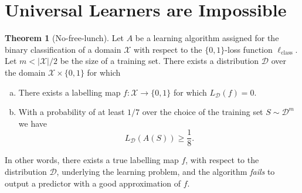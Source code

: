 \documentclass[11pt, reqno]{amsart}
\theoremstyle{definition}
\newtheorem{theorem}{Theorem}[section]
\renewcommand{\leq}{\leqslant}
\renewcommand{\geq}{\geqslant}
\DeclareMathOperator{\Expect}{\mathbb{E}} %
\begin{document}
\section{Universal Learners are Impossible}

\begin{theorem}[No-free-lunch]
\label{thm:no-free-lunch}
Let \(A\) be a learning algorithm assigned for the binary classification of a
domain \(\mathcal{X}\) with respect to the \(\{0, 1\}\)-loss function
\(\ell_{\text{class}}\). Let \(m < |\mathcal{X}|/2\) be the size of a training
set. There exists a distribution \(\mathcal{D}\) over the domain
\(\mathcal{X} \times \{0, 1\}\) for which
\begin{enumerate}[(a)]\setlength\itemsep{0em}
\item There exists a labelling map \(f: \mathcal{X} \to \{0, 1\}\) for which
  \(L_{\mathcal{D}}(f) = 0\).
\item With a probability of at least \(1/7\) over the choice of the training set
  \(S \sim \mathcal{D}^m\) we have
  \[
  L_{\mathcal{D}}(A(S)) \geq \frac{1}{8}.
  \]
\end{enumerate}
In other words, there exists a true labelling map \(f\), with respect to the
distribution \(\mathcal{D}\), underlying the learning problem, and the algorithm
\emph{fails} to output a predictor with a good approximation of \(f\).
\end{theorem}


\end{document}
